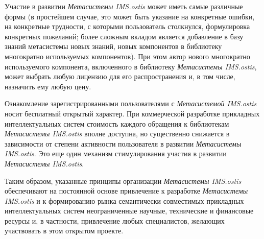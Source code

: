 \begin{SCn}
{\begin{scnitemize}
		\item Участие в развитии \textit{Метасистемы IMS.ostis} может иметь самые различные формы (в простейшем случае, это может быть указание на конкретные ошибки, на конкретные трудности, с которыми пользователь столкнулся, формулировка конкретных пожеланий; более сложным вкладом является добавление в базу знаний метасистемы новых знаний, новых компонентов в библиотеку многократно используемых компонентов). При этом автор нового многократно используемого компонента, включенного в библиотеку \textit{Метасистемы IMS.ostis}, может выбрать любую лицензию для его распространения и, в том числе, назначить ему любую цену.
		\item Ознакомление зарегистрированными пользователями с \textit{Метасистемой IMS.ostis} носит бесплатный открытый характер. При коммерческой разработке прикладных интеллектуальных систем стоимость каждого обращения к библиотекам \textit{Метасистемы IMS.ostis} вполне доступна, но существенно снижается в зависимости от степени активности пользователя в развитии \textit{Метасистемы IMS.ostis}. Это еще один механизм стимулирования участия в развитии \textit{Метасистемы IMS.ostis}.
	\end{scnitemize}
	
	Таким образом, указанные принципы организации \textit{Метасистемы IMS.ostis} обеспечивают на постоянной основе привлечение к разработке \textit{Метасистемы IMS.ostis} и к формированию рынка семантически совместимых прикладных интеллектуальных систем неограниченные научные, технические и финансовые ресурсы и, в частности, привлечение любых специалистов, желающих участвовать в этом открытом проекте.
}




\end{SCn}
